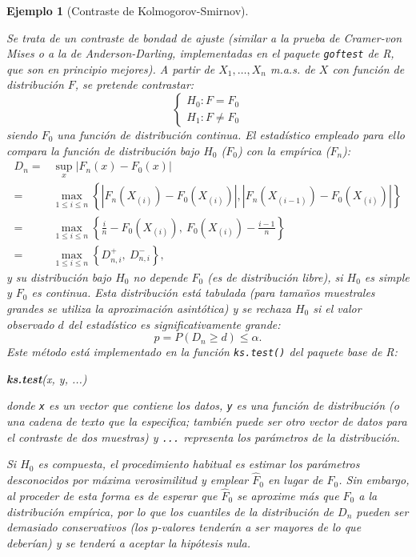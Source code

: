 \documentclass[
  spanish,
  10pt,
]{book}
\newenvironment{Shaded}{\begin{snugshade}}{\end{snugshade}}
\newcommand{\FunctionTok}[1]{\textcolor[rgb]{0.13,0.29,0.53}{\textbf{#1}}}
\newcommand{\NormalTok}[1]{#1}
\theoremstyle{break}
\newtheorem{example}{Ejemplo}[chapter]
\theoremstyle{nonumberplain}
\begin{document}
\begin{example}[Contraste de Kolmogorov-Smirnov]
\protect\hypertarget{exm:ks-test-sim-exp}{}\label{exm:ks-test-sim-exp}

Se trata de un contraste de bondad de ajuste (similar a la prueba de
Cramer-von Mises o a la de Anderson-Darling, implementadas en el paquete
\texttt{goftest} de R, que son en principio mejores).
A partir de \(X_1,\ldots ,X_n\) m.a.s. de \(X\) con función de distribución \(F\),
se pretende contrastar:
\[\left \{ 
\begin{array}{l}
H_0 : F = F_0 \\ 
H_1 : F \neq F_0 
\end{array}
\right. \]
siendo \(F_0\) una función de distribución continua.
El estadístico empleado para ello compara la función de distribución bajo
\(H_0\) (\(F_0\)) con la empírica (\(F_n\)):
\[\begin{aligned}
    D_n=&\sup_{x}|F_n(x)-F_0(x)| \\
    =&\max_{1 \leq i\leq n}\left \{
    |F_n(X_{(i)})-F_0(X_{(i)})|,|F_n(X_{(i-1)})-F_0(X_{(i)})|\right \} \\
    =&\max_{1 \leq i\leq n}\left \{ \frac{i}{n}-F_0(X_{(i)}), \ F_0(X_{(i)})-\frac{i-1}{n}\right \} \\
    =&\max_{1 \leq i\leq n}\left \{ D_{n,i}^{+},\ D_{n,i}^{-}\right \},
\end{aligned}\]
y su distribución bajo \(H_0\) no depende \(F_0\) (es de distribución libre),
si \(H_0\) es simple y \(F_0\) es continua.
Esta distribución está tabulada (para tamaños muestrales grandes se utiliza
la aproximación asintótica) y se rechaza \(H_0\) si el valor observado \(d\)
del estadístico es significativamente grande:
\[p = P \left( D_n \geq d \right) \leq \alpha.\]
Este método está implementado en la función \texttt{ks.test()} del paquete base de R:

\begin{Shaded}
\begin{Highlighting}[]
\FunctionTok{ks.test}\NormalTok{(x, y, ...)}
\end{Highlighting}
\end{Shaded}

donde \texttt{x} es un vector que contiene los datos, \texttt{y} es una función de distribución
(o una cadena de texto que la especifica; también puede ser otro vector de datos
para el contraste de dos muestras) y \texttt{...} representa los parámetros de la distribución.

Si \(H_0\) es compuesta, el procedimiento habitual es estimar los parámetros desconocidos
por máxima verosimilitud y emplear \(\hat{F}_0\) en lugar de \(F_0\).
Sin embargo, al proceder de esta forma es de esperar que \(\hat{F}_0\) se aproxime más
que \(F_0\) a la distribución empírica, por lo que los cuantiles de la distribución de
\(D_n\) pueden ser demasiado conservativos (los \(p\)-valores tenderán a ser mayores de
lo que deberían) y se tenderá a aceptar la hipótesis nula.


\end{example}
\end{document}
